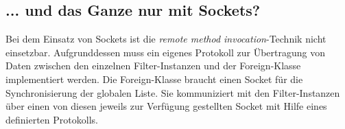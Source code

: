 \subsection*{... und das Ganze nur mit Sockets?}


Bei dem Einsatz von Sockets ist die \textit{remote method invocation}-Technik nicht einsetzbar.
Aufgrunddessen muss ein eigenes Protokoll zur Übertragung von Daten zwischen den einzelnen Filter-Instanzen und der Foreign-Klasse implementiert werden.
Die Foreign-Klasse braucht einen Socket für die Synchronisierung der globalen Liste.
Sie kommuniziert mit den Filter-Instanzen über einen von diesen jeweils zur Verfügung gestellten Socket mit Hilfe eines definierten Protokolls.
